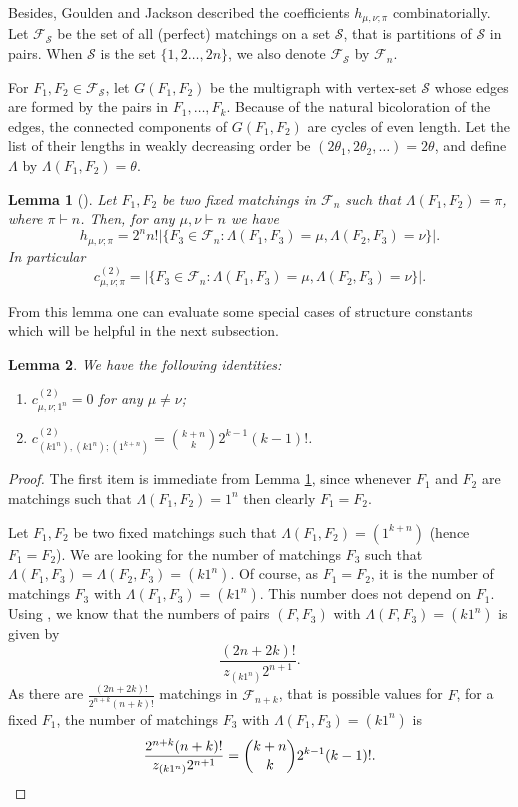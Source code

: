 \documentclass[11pt]{amsart}
\theoremstyle{plain}
\newtheorem{lemma}{Lemma}[section]
\theoremstyle{remark}
\begin{document}
Besides, Goulden and Jackson \cite{GouldenJacksonMapsZonal} described the coefficients $h_{\mu,\nu; \pi}$ combinatorially.
Let $\mathcal{F}_\mathcal{S}$ be the set of all (perfect) matchings on a set $\mathcal{S}$,
that is partitions of $\mathcal{S}$ in pairs.
When $\mathcal{S}$ is the set $\{1,2\dots,2n\}$, we also denote $\mathcal{F}_\mathcal{S}$ by $\mathcal{F}_n$.

For $F_1,F_2 \in \mathcal{F}_\mathcal{S}$,
let $G(F_1,F_2)$ be the multigraph with vertex-set $\mathcal{S}$ whose edges are formed by the pairs in $F_1,\dots,F_k$.
Because of the natural bicoloration of the edges,
the connected components of $G(F_1, F_2)$ are cycles of even length.
Let the list of their lengths in weakly decreasing order be $(2\theta_1, 2 \theta_2, \dots) = 2\theta$, and define $\Lambda$ by $\Lambda(F_1, F_2) = \theta$.

\begin{lemma}[{\cite[Lemma 2.2.]{GouldenJacksonMapsZonal}}]
\label{lem:ZonalSC}
Let $F_1, F_2$ be two fixed matchings in $\mathcal{F}_n$ such that $\Lambda(F_1,F_2) = \pi$, where $\pi \vdash n$. Then, for any $\mu, \nu \vdash n$ we have
\[ h_{\mu,\nu;\pi} = 2^n n! |\{F_3 \in \mathcal{F}_n: \Lambda(F_1, F_3) = \mu, \Lambda(F_2, F_3) = \nu\}|.\]
In particular 
\[ c^{(2)}_{\mu,\nu;\pi} = |\{F_3 \in \mathcal{F}_n: \Lambda(F_1, F_3) = \mu, \Lambda(F_2, F_3) = \nu\}|.\]
\end{lemma}

From this lemma one can evaluate some special cases of structure constants which will be helpful in the next subsection.

\begin{lemma}
\label{lem:SC2}
We have the following identities:
\begin{enumerate}
\item
\label{eq:SC2-1} 
$c^{(2)}_{\mu, \nu; 1^n} = 0$ for any $\mu \neq \nu$;
\item
\label{eq:SC2-2}
$c^{(2)}_{(k 1^n),(k 1^n);(1^{k+n})} = \binom{k+n}{k}2^{k-1}(k-1)!$.
\end{enumerate}
\end{lemma}

\begin{proof}
The first item is immediate from Lemma \ref{lem:ZonalSC},
since whenever $F_1$ and $F_2$ are matchings such that $\Lambda(F_1,F_2) = 1^n$ then clearly $F_1 = F_2$.

Let $F_1, F_2$ be two fixed matchings such that $\Lambda(F_1,F_2) = (1^{k+n})$ (hence $F_1 = F_2$).
We are looking for the number of matchings $F_3$ such that $\Lambda(F_1,F_3)=\Lambda(F_2,F_3)=(k 1^n)$.
Of course, as $F_1=F_2$, it is the number of matchings $F_3$ with $\Lambda(F_1,F_3)=(k 1^n)$.
This number does not depend on $F_1$.
Using \cite[Lemma 2.4]{NousZonal}, we know that the numbers of pairs $(F,F_3)$
with $\Lambda(F,F_3)=(k 1^n)$ is given by 
\[\frac{(2n+2k)!}{z_{(k 1^n)} 2^{n+1}}.\]
As there are $\frac{(2n+2k)!}{2^{n+k} (n+k)!}$ matchings in $\mathcal{F}_{n+k}$, that is possible values for $F$,
for a fixed $F_1$, the number of matchings $F_3$ with $\Lambda(F_1,F_3)=(k 1^n)$ is
\[\frac{2^{n+k} (n+k)!}{z_{(k 1^n)} 2^{n+1}}=\binom{k+n}{k}2^{k-1}(k-1)!.\qedhere\]
\end{proof}
\end{document}
